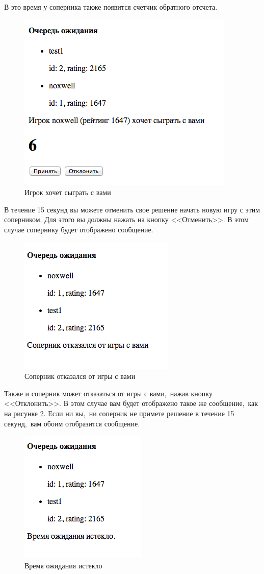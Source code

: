 \documentclass[14pt,a4paper]{report}
\begin{document}
В это время у соперника также появится счетчик обратного отсчета.
\begin{figure}[H]
\centerline{\includegraphics[scale=0.5]{gfx/10_queue_accepting.png}}
\caption{Игрок хочет сыграть с вами}
\label{fig:queue_accepting}
\end{figure}
В течение 15 секунд вы можете отменить свое решение начать новую игру с этим соперником. Для этого вы должны нажать на кнопку <<Отменить>>. В этом случае сопернику будет отображено сообщение.
\begin{figure}[H]
\centerline{\includegraphics[scale=0.5]{gfx/11_queue_fail.png}}
\caption{Соперник отказался от игры с вами}
\label{fig:queue_fail}
\end{figure}
Также и соперник может отказаться от игры с вами,~нажав кнопку <<Отклонить>>. В этом случае вам будет отображено такое же сообщение,~как на рисунке \ref{fig:queue_fail}.
Если ни вы,~ни соперник не примете решение в течение 15 секунд,~вам обоим отобразится сообщение.
\begin{figure}[H]
\centerline{\includegraphics[scale=0.5]{gfx/12_queue_timeout.png}}
\caption{Время ожидания истекло}
\label{fig:queue_timeout}
\end{figure}
\end{document}
